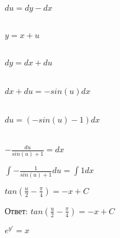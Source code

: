 \documentclass{article}
\begin{document}
\begin{center}
\end{center}

\begin{flushleft}
    $du = dy - dx$\\\\
\end{flushleft}

\begin{flushleft}
    $y = x + u$\\\\
\end{flushleft}

\begin{flushleft}
    $dy = dx + du$\\\\
\end{flushleft}

\begin{center}
\end{center}

\begin{flushleft}
    $dx + du = -sin(u)dx$\\\\
\end{flushleft}

\begin{flushleft}
    $du = (-sin(u) - 1)dx$\\\\
\end{flushleft}

\begin{flushleft}
    $-\frac{du}{sin(u) + 1} = dx$
\end{flushleft}

\begin{flushleft}
    $\int-\frac{1}{sin(u)+1}du = \int1dx$
\end{flushleft}

\begin{flushleft}
    $tan({\frac{u}{2} - \frac{\pi}{4}}) = -x + C$
\end{flushleft}

\begin{center}
    Ответ: $tan({\frac{u}{2} - \frac{\pi}{4}}) = -x + C$
\end{center}

\begin{center}
    $e^{y'} = x$
\end{center}
\end{document}
